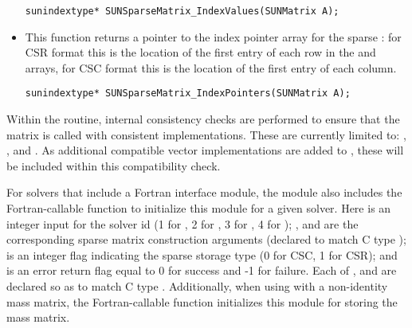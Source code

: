 \begin{itemize}
  \verb|sunindextype* SUNSparseMatrix_IndexValues(SUNMatrix A);|


\item {}

  This function returns a pointer to the index pointer array for the
  sparse : for CSR format this is the location of the first
  entry of each row in the  and  arrays, for
  CSC format this is the location of the first entry of each column.
 
  \verb|sunindextype* SUNSparseMatrix_IndexPointers(SUNMatrix A);|

\end{itemize}
{\warn} Within the  routine, internal
consistency checks are performed to ensure that the matrix is called
with consistent {\nvector} implementations.  These are currently
limited to: {\nvecs}, {\nvecopenmp}, and {\nvecpthreads}.  As
additional compatible vector implementations are added to {\sundials},
these will be included within this compatibility check. 


For solvers that include a Fortran interface module, the {\sunmatsparse}
module also includes the Fortran-callable
function  to
initialize this {\sunmatsparse} module for a given {\sundials} solver.
Here  is an integer input for the solver id (1 for {\cvode},
2 for {\ida}, 3 for {\kinsol}, 4 for {\arkode}); , 
and  are the corresponding sparse matrix construction
arguments (declared to match C type );  is an integer flag indicating the sparse
storage type (0 for CSC, 1 for CSR); and  is an error return
flag equal to 0 for success and -1 for failure. Each of ,
 and  are declared so as to match C
type . Additionally, when using {\arkode} with a non-identity
mass matrix, the Fortran-callable
function  
initializes this {\sunmatsparse} module for storing the mass matrix.
